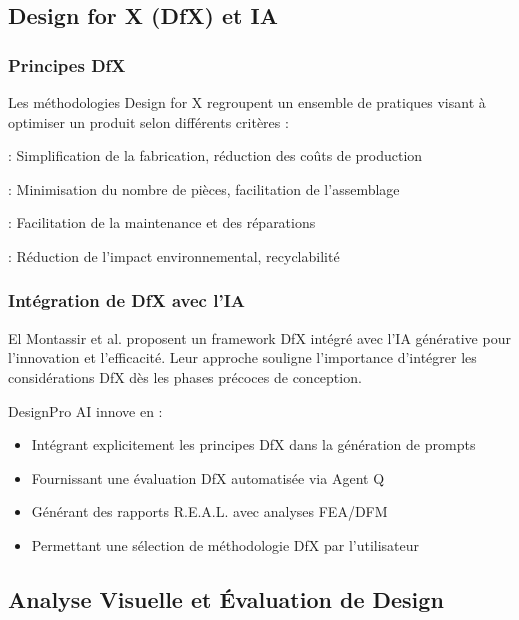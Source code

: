 \subsection{Design for X (DfX) et IA}

\subsubsection{Principes DfX}

Les méthodologies Design for X regroupent un ensemble de pratiques visant à optimiser un produit selon différents critères \cite{kuo2001}:

\begin{description}[leftmargin=*]
    \item[DFM (Design for Manufacturing)] : Simplification de la fabrication, réduction des coûts de production
    \item[DFA (Design for Assembly)] : Minimisation du nombre de pièces, facilitation de l'assemblage
    \item[DFS (Design for Serviceability)] : Facilitation de la maintenance et des réparations
    \item[DFSust (Design for Sustainability)] : Réduction de l'impact environnemental, recyclabilité
\end{description}

\subsubsection{Intégration de DfX avec l'IA}

El Montassir et al. \cite{elmontassir2024leveraging} proposent un framework DfX intégré avec l'IA générative pour l'innovation et l'efficacité. Leur approche souligne l'importance d'intégrer les considérations DfX dès les phases précoces de conception.

DesignPro AI innove en :
\begin{itemize}[leftmargin=*]
    \item Intégrant explicitement les principes DfX dans la génération de prompts
    \item Fournissant une évaluation DfX automatisée via Agent Q
    \item Générant des rapports R.E.A.L. avec analyses FEA/DFM
    \item Permettant une sélection de méthodologie DfX par l'utilisateur
\end{itemize}

\subsection{Analyse Visuelle et Évaluation de Design}

